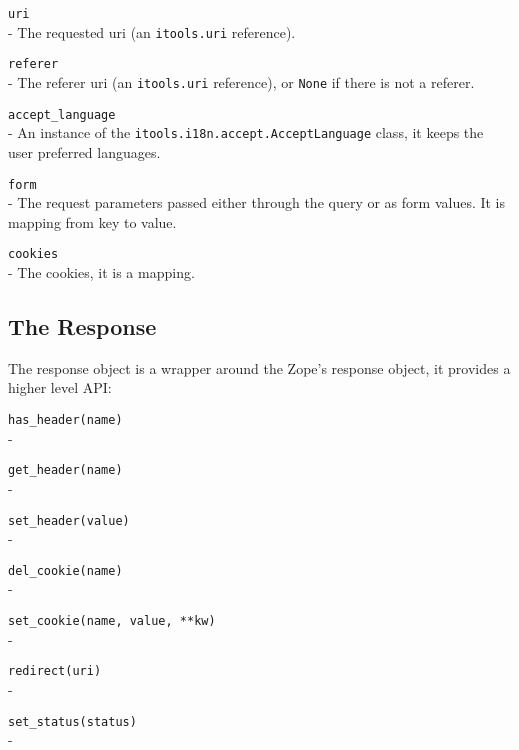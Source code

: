 \begin{api}
    {\tt uri}\\
    - The requested uri (an {\tt itools.uri} reference).

    {\tt referer}\\
    - The referer uri (an {\tt itools.uri} reference), or {\tt None} if
      there is not a referer.

    {\tt accept\_language}\\
    - An instance of the {\tt itools.i18n.accept.AcceptLanguage} class, it
      keeps the user preferred languages.

    {\tt form}\\
    - The request parameters passed either through the query or as form
      values. It is mapping from key to value.

    {\tt cookies}\\
    - The cookies, it is a mapping.
\end{api}


\subsection{The Response}

The response object is a wrapper around the Zope's response object, it
provides a higher level API:


\begin{api}
  {\tt has\_header(name)}\\
  - 

  {\tt get\_header(name)}\\
  - 

  {\tt set\_header(value)}\\
  - 

  {\tt del\_cookie(name)}\\
  - 

  {\tt set\_cookie(name, value, **kw)}\\
  - 

  {\tt redirect(uri)}\\
  - 

  {\tt set\_status(status)}\\
  - 
\end{api}